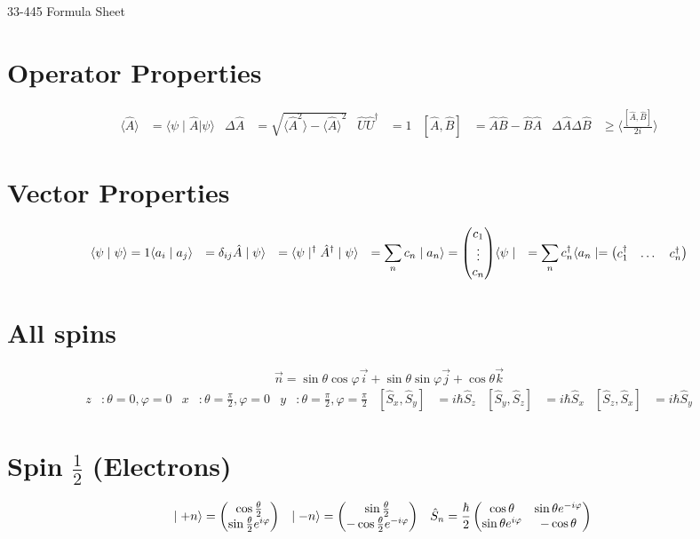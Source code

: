 \documentclass{article}
\newcommand{\mysection}[1]{\vspace{-2em}
\section*{#1}
\vspace{-2em}}
\newcommand{\bra}[1]{\ensuremath{\langle#1\mid}}
\newcommand{\ket}[1]{\ensuremath{\mid#1\rangle}}
\newcommand{\braket}[2]{\ensuremath{\langle#1\mid#2\rangle}}
\newcommand{\expect}[1]{\ensuremath{\langle#1\rangle}}
\newcommand{\op}[1]{\ensuremath{\hat#1}}
\newcommand{\opt}[1]{\tp{\op{#1}}}
\newcommand{\tp}[1]{\ensuremath{#1^\dagger}}
\newcommand{\mat}[1]{\ensuremath{\begin{pmatrix}\ensuremath{#1}\end{pmatrix}}}
\begin{document}
	\begin{center}
		{\LARGE{33-445 Formula Sheet}}
	\end{center}
	\mysection{Operator Properties}
	\begin{align*}
		\expect{\op{A}}&=\bra{\psi}\op{A}\ket{\psi} &
		\Delta\op{A}&=\sqrt{\expect{\op{A}^2}-\expect{\op{A}}^2} &
		\op{U}\opt{U}&=1 & 
		[\op{A},\op{B}]&=\op{A}\op{B}-\op{B}\op{A} &
		\Delta\op{A}\Delta\op{B}&\ge\expect{\frac{[\op{A},\op{B}]}{2i}}
	\end{align*}
	\mysection{Vector Properties}
	\begin{align*}
		\braket{\psi}{\psi}=1 &
		\braket{a_i}{a_j}&=\delta_{ij} &
		\op{A}\ket{\psi}&=\tp{\bra{\psi}}\opt{A} &
		\ket{\psi}&=\sum\limits_nc_n\ket{a_n}=\mat{c_1\\\vdots\\c_n} &
		\bra{\psi}&=\sum\limits_n\tp{c_n}\bra{a_n}=\mat{\tp{c_1}&\dots&\tp{c_n}}
	\end{align*}
	\mysection{All spins}
	\[\vec{n}=\sin\theta\cos\varphi\vec{i}+
			\sin\theta\sin\varphi\vec{j}+\cos\theta\vec{k}\]
	\begin{align*}
		z&:\theta=0,\varphi=0 & 
		x&:\theta=\frac{\pi}{2},\varphi=0 &
		y&:\theta=\frac{\pi}{2},\varphi=\frac{\pi}{2} &
		[\op{S_x},\op{S_y}]&=i\hbar\op{S_z} &
		[\op{S_y},\op{S_z}]&=i\hbar\op{S_x} &
		[\op{S_z},\op{S_x}]&=i\hbar\op{S_y}
	\end{align*}
	\mysection{Spin $\frac{1}{2}$ (Electrons)}
	\begin{align*}
		\ket{+n}&=\mat{\cos\frac{\theta}{2}\\
			\sin\frac{\theta}{2}e^{i\varphi}} &
		\ket{-n}&=\mat{\sin\frac{\theta}{2}\\
			-\cos\frac{\theta}{2}e^{-i\varphi}} &
		\op{S_n}&=\frac{\hbar}{2}\mat{\cos\theta&\sin\theta e^{-i\varphi}\\
			\sin\theta e^{i\varphi}&-\cos\theta} %
	\end{align*}
\end{document}
